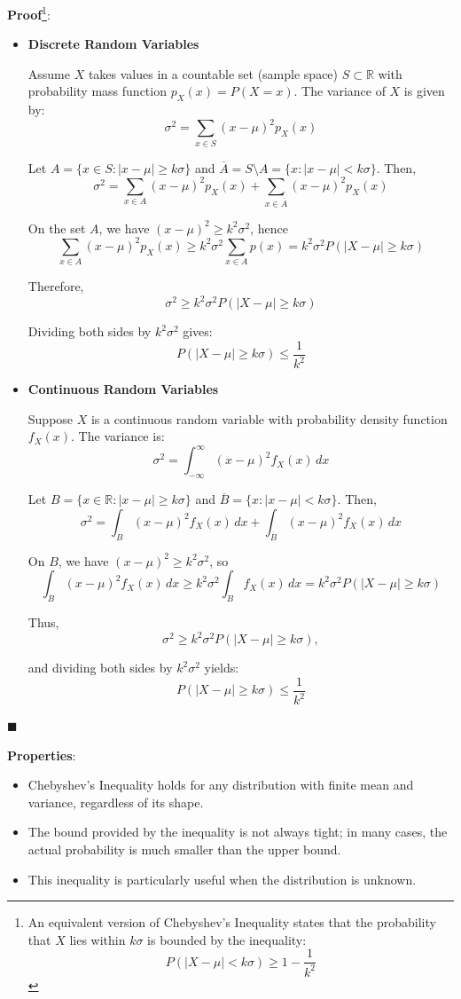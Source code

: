\documentclass[twoside]{book}
\begin{document}
\textbf{Proof}\footnote{An equivalent version of Chebyshev's Inequality states that the probability that $X$ lies within $k\sigma$ is bounded by the inequality:
\[
P(|X - \mu| < k\sigma) \geq 1 - \frac{1}{k^2}
\]}: 
\begin{itemize}
    \item \textbf{Discrete Random Variables}

Assume $X$ takes values in a countable set (sample space) $S \subset \mathbb{R}$ with probability mass function $p_X(x) = P(X = x)$. The variance of $X$ is given by:
\[
\sigma^2 = \sum_{x \in S} (x - \mu)^2 p_X(x)
\]

Let $A = \{x \in S : |x - \mu| \geq k\sigma \}$ and $\overline{A} = S \setminus A = \{x : |x - \mu| < k\sigma \}$. Then,
\[
\sigma^2 = \sum_{x \in A} (x - \mu)^2 p_X(x) + \sum_{x \in \overline{A}} (x - \mu)^2 p_X(x)
\]

On the set $A$, we have $(x - \mu)^2 \geq k^2 \sigma^2$, hence
\[
\sum_{x \in A} (x - \mu)^2 p_X(x) \geq k^2 \sigma^2 \sum_{x \in A} p(x) = k^2 \sigma^2 P(|X - \mu| \geq k\sigma)
\]

Therefore,
\[
\sigma^2 \geq k^2 \sigma^2 P(|X - \mu| \geq k\sigma)
\]

Dividing both sides by $k^2 \sigma^2$ gives:
\[
P(|X - \mu| \geq k\sigma) \leq \frac{1}{k^2}
\]

\item \textbf{Continuous Random Variables}

Suppose $X$ is a continuous random variable with probability density function $f_X(x)$. The variance is:
\[
\sigma^2 = \int_{-\infty}^{\infty} (x - \mu)^2 f_X(x) \, dx
\]

Let $B = \{x \in \mathbb{R} : |x - \mu| \geq k\sigma \}$ and $\overline{B}= \{x : |x - \mu| < k\sigma \}$. Then,
\[
\sigma^2 = \int_{B} (x - \mu)^2 f_X(x) \, dx + \int_{\overline{B}} (x - \mu)^2 f_X(x) \, dx
\]

On $B$, we have $(x - \mu)^2 \geq k^2 \sigma^2$, so
\[
\int_{B} (x - \mu)^2 f_X(x) \, dx \geq k^2 \sigma^2 \int_{B} f_X(x) \, dx = k^2 \sigma^2 P(|X - \mu| \geq k\sigma)
\]

Thus,
\[
\sigma^2 \geq k^2 \sigma^2 P(|X - \mu| \geq k\sigma),
\]

and dividing both sides by $k^2 \sigma^2$ yields:
\[
P(|X - \mu| \geq k\sigma) \leq \frac{1}{k^2}
\]
\end{itemize}
\hfill\(\blacksquare\)


\textbf{Properties}:

\begin{itemize}
    \item Chebyshev's Inequality holds for any distribution with finite mean and variance, regardless of its shape.
    \item The bound provided by the inequality is not always tight; in many cases, the actual probability is much smaller than the upper bound.
    \item This inequality is particularly useful when the distribution is unknown.
\end{itemize}
\end{document}

